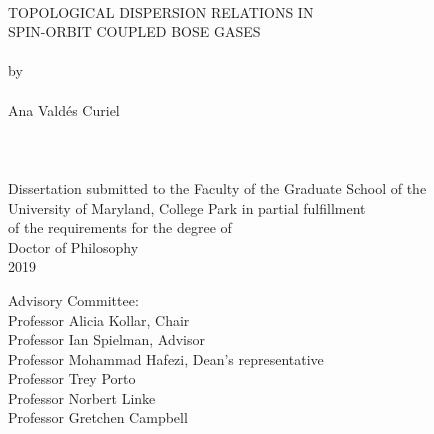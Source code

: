 
\thispagestyle{empty}
\hbox{\ }
\vspace{1in}
\renewcommand{\baselinestretch}{1}
\small\normalsize
\begin{center}

\large{{TOPOLOGICAL DISPERSION RELATIONS IN}} \\
\large{{SPIN-ORBIT COUPLED BOSE GASES}}
\ \\
\ \\
\large{by} \\
\ \\
\large{Ana Vald\'es Curiel}%
\ \\
\ \\
\ \\
\ \\
\normalsize
Dissertation submitted to the Faculty of the Graduate School of the \\
University of Maryland, College Park in partial fulfillment \\
of the requirements for the degree of \\
Doctor of Philosophy \\
2019
\end{center}

\vspace{7.5em}

\noindent Advisory Committee: \\
Professor Alicia Kollar, Chair \\
Professor Ian Spielman, Advisor \\
Professor Mohammad Hafezi, Dean's representative \\
Professor Trey Porto \\
Professor Norbert Linke  \\
Professor Gretchen Campbell \\


